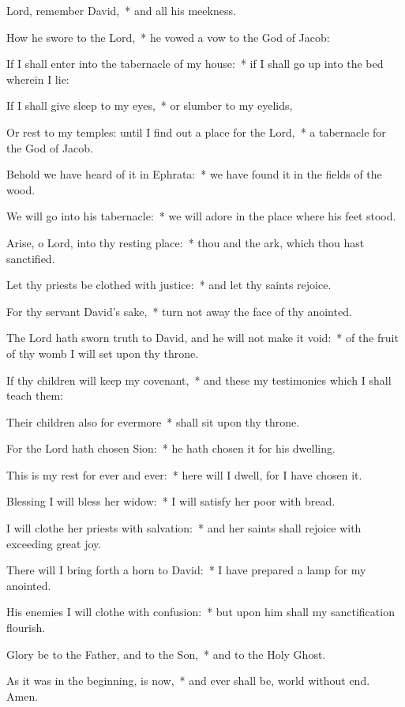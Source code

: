 \begin{enpars}
\item  Lord, remember David,~* and all his meekness.
\item  How he swore to the Lord,~* he vowed a vow to the God of Jacob:
\item  If I shall enter into the tabernacle of my house:~* if I shall go up into the bed wherein I lie:
\item  If I shall give sleep to my eyes,~* or slumber to my eyelids,
\item  Or rest to my temples: until I find out a place for the Lord,~* a tabernacle for the God of Jacob.
\item  Behold we have heard of it in Ephrata:~* we have found it in the fields of the wood.
\item  We will go into his tabernacle:~* we will adore in the place where his feet stood.
\item  Arise, o Lord, into thy resting place:~* thou and the ark, which thou hast sanctified.
\item  Let thy priests be clothed with justice:~* and let thy saints rejoice.
\item For thy servant David’s sake,~* turn not away the face of thy anointed.
\item The Lord hath sworn truth to David, and he will not make it void:~* of the fruit of thy womb I will set upon thy throne.
\item If thy children will keep my covenant,~* and these my testimonies which I shall teach them:
\item Their children also for evermore~* shall sit upon thy throne.
\item For the Lord hath chosen Sion:~* he hath chosen it for his dwelling.
\item This is my rest for ever and ever:~* here will I dwell, for I have chosen it.
\item Blessing I will bless her widow:~* I will satisfy her poor with bread.
\item I will clothe her priests with salvation:~* and her saints shall rejoice with exceeding great joy.
\item There will I bring forth a horn to David:~* I have prepared a lamp for my anointed.
\item His enemies I will clothe with confusion:~* but upon him shall my sanctification flourish.
\item Glory be to the Father, and to the Son,~* and to the Holy Ghost.
\item As it was in the beginning, is now,~* and ever shall be, world without end. Amen.
\end{enpars}